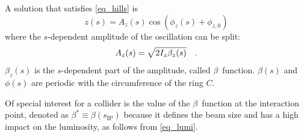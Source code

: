 A solution that satisfies \eqref{eq_hills} is
%
\begin{equation}
    z(s) = A_z(s) \cos\left(\phi_z(s) + \phi_{z,0} \right)
    \label{eq_betatron_osc}
\end{equation}
%
where the $s$-dependent amplitude of the oscillation can be split:
%
\begin{equation}
    A_z(s) = \sqrt{2I_z \beta_z(s)}
    \quad .
    \label{eq_betatron_ampl}
\end{equation}
%
$\beta_z(s)$ is the $s$-dependent part of the amplitude, called $\beta$~function.
$\beta(s)$ and $\phi(s)$ are periodic with the circumference of the ring $C$.

Of special interest for a collider is the value of the $\beta$~function at the interaction point,
denoted as $\beta^* \equiv \beta(s_\text{IP})$ because it defines the beam size and
has a high impact on the luminosity, as follows from \eqref{eq_lumi}.

